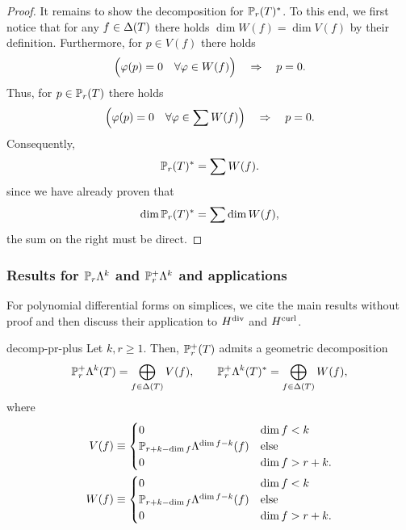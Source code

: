 \begin{proof}
  It remains to show the decomposition for $\P_r(\cell)^*$. To this
  end, we first notice that for any $f\in\Delta(\cell)$ there holds
  $\dim W(f) = \dim V(f)$ by their definition. Furthermore, for
  $p\in V(f)$ there holds
  \begin{gather*}
    \Bigl(\phi(p) = 0 \quad\forall \phi\in W(f)\Bigr)
    \quad\Rightarrow\quad
    p=0.
  \end{gather*}
  Thus, for $p\in \P_r(\cell)$ there holds
  \begin{gather*}
    \Bigl(\phi(p) = 0 \quad\forall \phi\in \sum W(f)\Bigr)
    \quad\Rightarrow\quad
    p=0.
  \end{gather*}
  Consequently,
  \begin{gather*}
    \P_r(\cell)^* = \sum W(f).
  \end{gather*}
  since we have already proven that
  \begin{gather*}
    \dim \P_r(\cell)^* = \sum \dim W(f),
  \end{gather*}
  the sum on the right must be direct.
\end{proof}

\subsubsection{Results for $\P_r\Lambda^k$ and $\P_r^+\Lambda^k$ and applications}

For polynomial differential forms on simplices, we cite the main
results without proof and then discuss their application to $\Hdiv$
and $\Hcurl$.

\begin{Theorem}{decomp-pr-plus}
  Let $k,r\ge 1$. Then, $\P_r^+(\cell)$ admits a geometric decomposition
  \begin{gather}
    \P_r^+\Lambda^k(\cell) = \bigoplus_{f\in\Delta(\cell)} V(f),
    \qquad
    \P_r^+\Lambda^k(\cell)^* = \bigoplus_{f\in\Delta(\cell)} W(f),
  \end{gather}
  where
  \begin{align}
    V(f) \equiv
    \begin{cases}
      0 & \dim f < k\\
      \P_{r+k-\dim f} \Lambda^{\dim f-k}(f) &\text{else}\\
      0 & \dim f > r+k.
    \end{cases}
    \\
    W(f) \equiv
    \begin{cases}
      0 & \dim f < k\\
      \P_{r+k-\dim f} \Lambda^{\dim f-k}(f) &\text{else}\\
      0 & \dim f > r+k.
    \end{cases}
  \end{align}
\end{Theorem}

